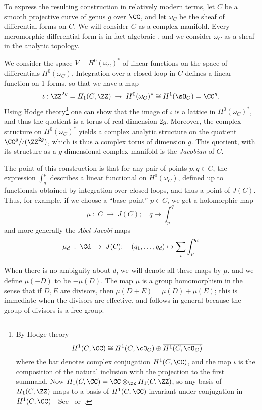 To express the resulting construction in relatively modern terms, let $C$ be a smooth projective curve of genus $g$ over $\CC$, and let $\omega_{C}$ be the sheaf of differential forms on $C$. We will consider $C$ as a complex manifold. Every meromorphic differential form is in fact algebraic
\cite{SerreGAGA}, and we consider $\omega_{C}$ as a sheaf in the analytic topology.

We consider the space $V = H^0(\omega_C)^*$ of linear functions on the space of differentials $H^0(\omega_C)$.  Integration over a closed loop in $C$ defines a linear function on 1-forms, so that we have a map
$$
\iota: \ZZ^{2g} = H_1(C,\ZZ) \; \to \;  H^0(\omega_C)^* \cong H^1(\sO_C) = \CC^{g}.
$$
Using  Hodge theory\footnote{By Hodge theory 
$$
H^1(C, \CC) \cong H^1(C, \cO_C) \oplus \overline{H^1(C, \cO_C)}
$$
where the bar denotes complex conjugation $H^1(C, \CC)$, and the map $\iota$ is the composition of 
 the natural inclusion with the projection to the first summand.
 Now
$H_1(C,\CC) = \CC\otimes_\ZZ H_1(C,\ZZ)$, so any basis of $H_1(C,\ZZ)$ maps to a basis of 
 $H^1(C, \CC)$ invariant under conjugation in $H^1(C, \CC)$---See~\cite{Voisin} or~\cite{Griffiths-Harris1978}. 
}
one can show that the image of $\iota$ is a lattice in $H^0(\omega_C)^*$, and thus the quotient
is a torus of real dimension $2g$. Moreover, the
complex structure on $H^0(\omega_C)^*$ yields a complex analytic structure on the quotient $\CC^{g}/\iota(\ZZ^{2g})$, which is thus a complex torus of  dimension $g$.  This quotient, with its structure as a $g$-dimensional complex manifold is the \emph{Jacobian} of $C$.

The point of this construction is that for any pair of points $p, q \in C$, the expression $\int_q^p$ describes a linear functional on $H^0(\omega_C)$, defined up to functionals obtained by integration over closed loops, and thus a point of $J(C)$. Thus, for example, if we choose a ``base point''  $p\in C$, we get a holomorphic map
$$
\mu \; : \; C \; \to \; J(C); \quad q\mapsto \int_{p}^{q}
$$
and more generally the \emph{Abel-Jacobi} maps
$$
\mu_d \; : \; \Cd \; \to \; J(C); \quad (q_1,\dots, q_d) \mapsto \sum_i \int_{p}^{q_i}
$$

When there is no ambiguity about $d$, we will denote all these maps  by $\mu$.  and  
we define $\mu(-D)$ to be $-\mu(D)$. 
The map $\mu$ is a group homomorphism in the sense that if $D, E$ are divisors, then
$\mu (D+E) = \mu(D) + \mu(E)$; this is immediate when the divisors are effective, and 
follows in general because the group of divisors is a free group.

